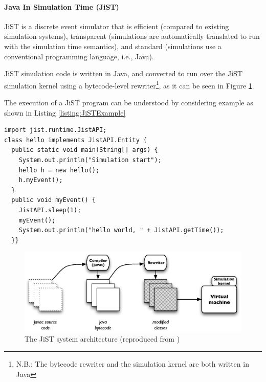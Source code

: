 \paragraph{Java In Simulation Time (JiST)} \label{subsec:jist}

JiST \cite{barr_JIST:2005} is a discrete event simulator that is 
efficient (compared to existing simulation systems), 
transparent (simulations are automatically translated to run with the 
simulation time semantics), and standard (simulations use a
conventional programming language, i.e., Java).

JiST simulation code is written in Java, and converted to run over the JiST 
simulation kernel using a bytecode-level rewriter\footnote{N.B.: The bytecode 
rewriter and the simulation kernel are both written in Java},  as it can be
seen in Figure \ref{Fig:JiST_architecture}.

The execution of a JiST program can be understood by considering example as
shown in Listing \ref{listing:JiSTExample}

\begin{lstlisting}[frame=trbl, basewidth={0.55em, 0.6em}, captionpos=b, 
basicstyle=\ttfamily\footnotesize, breaklines, caption = Example JiST program (reproduced from \cite{barr_JIST:2005}, label = listing:JiSTExample]  
import jist.runtime.JistAPI;  
class hello implements JistAPI.Entity { 
  public static void main(String[] args) { 
    System.out.println("Simulation start"); 
    hello h = new hello(); 
    h.myEvent(); 
  } 
  public void myEvent() { 
    JistAPI.sleep(1); 
    myEvent(); 
    System.out.println("hello world, " + JistAPI.getTime()); 
  }} 
\end{lstlisting}

\begin{figure}
\centering
\includegraphics[width=\textwidth]{img/JiST_architecture.eps} 
\caption[The JiST System Architecture]{The JiST system architecture (reproduced from
\cite{barr_JIST:2005})}
\label{Fig:JiST_architecture}
\end{figure}  
 
